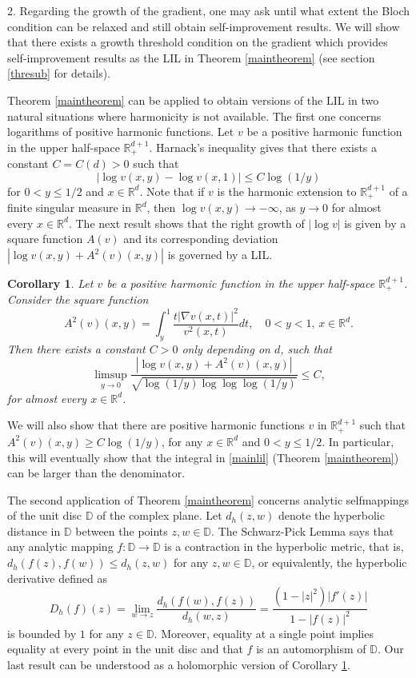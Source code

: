 \documentclass[11pt,letterpaper]{amsart}
\newtheorem{cor}{Corollary}[section]
\theoremstyle{definition}
\numberwithin{equation}{section}
\newcommand{\R}{\mathbb R}
\newcommand{\D}{\mathbb D}
\begin{document}
\medskip

2. Regarding the growth of the gradient, one may ask until what extent the Bloch condition can be relaxed and still obtain  self-improvement results. We will show that there exists a growth threshold  condition on the gradient which provides self-improvement results as the LIL in Theorem \ref{maintheorem} (see section \ref{thresub} for details). 

\medskip

Theorem \ref{maintheorem} can be applied to obtain versions of the LIL in two natural situations where harmonicity is not available. The first one concerns logarithms of positive harmonic functions. Let $v$ be a positive harmonic function in the upper half-space $\R^{d+1}_{+}$. Harnack's inequality gives that there exists a constant $C=C(d) >0$ such that 
$$
|\log v(x,y) - \log v (x,1)| \leq C \log (1/y) 
$$ 
for $0<y\leq 1/2$ and $x \in \R^d$. Note that if $v$ is the harmonic extension to $\R_+^{d+1}$ of a finite singular measure in $\R^d$, then $\log v (x,y) \to - \infty$, as $y \to 0$ for almost every $x\in \R^d$.  The next result shows that the right growth of $|\log v|$ is given by a square function $A(v)$ and its corresponding deviation $|\log v(x,y) + A^2 (v) (x,y)|$ is governed by a LIL.

\begin{cor}
    \label{positiveharmonic}
    Let $v$ be a positive harmonic function in the upper half-space $\R^{d+1}_{+}$. Consider the square function 
    $$
    A^2 (v) (x,y) = \int_y^1 \frac{t |\nabla v (x,t)|^2}{v^2 (x,t)} dt , \quad 0<y<1, \, x \in \R^d. 
    $$
    Then there exists a constant $C>0$ only depending on $d$, such that 
    \begin{equation*}
        \limsup_{y \to 0 } \frac{|\log v(x,y) + A^2 (v) (x,y)|}{\sqrt{\log(1/y) \log \log \log (1/y)}} \leq C,
    \end{equation*}
for almost every $x \in \R^d$. 
\end{cor}

We will also show that there are positive harmonic functions $v$ in $\R_+^{d+1}$ such that $A^2 (v) (x,y) \geq C \log (1/y)$, for any $x\in \R^d$ and $0<y\leq 1/2$. In particular, this will eventually show that the integral in \eqref{mainlil} (Theorem \ref{maintheorem}) can be larger than the denominator.

The second application of Theorem \ref{maintheorem} concerns analytic selfmappings of the unit disc $\D$ of the complex plane. Let $d_h (z,w)$ denote the hyperbolic distance in $\D$ between the points $z,w \in \D$. The Schwarz-Pick Lemma says that any analytic mapping $f:\D \rightarrow \D$ is a contraction in the hyperbolic metric, that is, $d_h (f(z), f(w)) \leq d_h (z,w)$ for any $z,w \in \D$, or equivalently, the hyperbolic derivative defined as
$$
D_h (f) (z) = \lim_{w \to z} \frac{d_h (f(w), f(z))}{d_h (w, z)} = \frac{(1-|z|^2 ) |f'(z)|}{1-|f(z)|^2}
$$
is bounded by $1$ for any $z \in \D$. Moreover, equality at a single point implies equality at every point in the unit disc and that $f$ is an automorphism of $\D$. Our last result can be understood as a holomorphic version of Corollary \ref{positiveharmonic}. 
\end{document}

